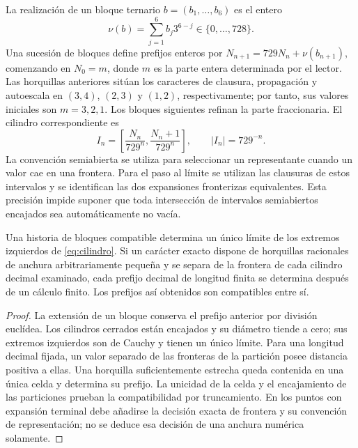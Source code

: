 La realización de un bloque ternario \(b=(b_1,\ldots,b_6)\) es el entero
\[
 \nu(b)=\sum_{j=1}^6b_j3^{6-j}\in\{0,\ldots,728\}.
\]
Una sucesión de bloques define prefijos enteros por \(N_{n+1}=729N_n+\nu(b_{n+1})\), comenzando en \(N_0=m\), donde \(m\) es la parte entera determinada por el lector. Las horquillas anteriores sitúan los caracteres de clausura, propagación y autoescala en \((3,4)\), \((2,3)\) y \((1,2)\), respectivamente; por tanto, sus valores iniciales son \(m=3,2,1\). Los bloques siguientes refinan la parte fraccionaria. El cilindro correspondiente es
\begin{equation}
 I_n=\left[\frac{N_n}{729^n},\frac{N_n+1}{729^n}\right],
 \qquad |I_n|=729^{-n}.
 \label{eq:cilindro}
\end{equation}
La convención semiabierta se utiliza para seleccionar un representante cuando un valor cae en una frontera. Para el paso al límite se utilizan las clausuras de estos intervalos y se identifican las dos expansiones fronterizas equivalentes. Esta precisión impide suponer que toda intersección de intervalos semiabiertos encajados sea automáticamente no vacía.

\begin{theorem}
Una historia de bloques compatible determina un único límite de los extremos izquierdos de \eqref{eq:cilindro}. Si un carácter exacto dispone de horquillas racionales de anchura arbitrariamente pequeña y se separa de la frontera de cada cilindro decimal examinado, cada prefijo decimal de longitud finita se determina después de un cálculo finito. Los prefijos así obtenidos son compatibles entre sí.
\end{theorem}
\begin{proof}
La extensión de un bloque conserva el prefijo anterior por división euclídea. Los cilindros cerrados están encajados y su diámetro tiende a cero; sus extremos izquierdos son de Cauchy y tienen un único límite. Para una longitud decimal fijada, un valor separado de las fronteras de la partición posee distancia positiva a ellas. Una horquilla suficientemente estrecha queda contenida en una única celda y determina su prefijo. La unicidad de la celda y el encajamiento de las particiones prueban la compatibilidad por truncamiento. En los puntos con expansión terminal debe añadirse la decisión exacta de frontera y su convención de representación; no se deduce esa decisión de una anchura numérica solamente.
\end{proof}

